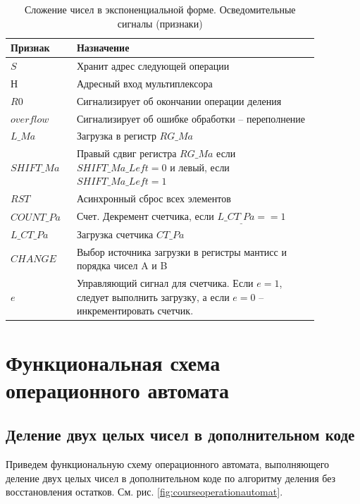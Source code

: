 \documentclass[a4paper,14pt]{extarticle}
\begin{document}
\begin{table}[h!]
	\centering
	\small
	\begin{tabular}{|m{0.17\linewidth}|m{0.7\linewidth}|}
		\hline
		\textbf{Признак} & \textbf{Назначение} \\ \hline
		$S$ & Хранит адрес следующей операции \\ \hline
		$Н$ & Адресный вход мультиплексора \\ \hline
		$R0$ & Сигнализирует об окончании операции деления \\ \hline
		$overflow$ & Сигнализирует об ошибке обработки -- переполнение \\ \hline
		$L\_Ma$ & Загрузка в регистр $RG\_Ma$ \\ \hline
		$SHIFT\_Ma$ & Правый сдвиг регистра $RG\_Ma$ если $SHIFT\_Ma\_Left=0$ и левый, если  $SHIFT\_Ma\_Left=1$ \\ \hline
		$RST$ & Асинхронный сброс всех элементов \\ \hline
		$COUNT\_Pa$ & Счет. Декремент счетчика, если $L\_CT_\_Pa==1$ \\ \hline
		$L\_CT\_Pa$ & Загрузка счетчика $CT\_Pa$ \\ \hline
		$CHANGE$ & Выбор источника загрузки в регистры мантисс и порядка чисел A и B \\ \hline
		$e$ & Управляющий сигнал для счетчика. Если $e=1$, следует выполнить загрузку, а если $e=0$ -- инкрементировать счетчик. \\ \hline
	\end{tabular}
	\caption{Сложение чисел в экспоненциальной форме. Осведомительные сигналы (признаки)}
	\label{tab:signalsop2}
\end{table}




\section{Функциональная схема операционного автомата}
\subsection{Деление двух целых чисел в дополнительном коде}
Приведем функциональную схему операционного автомата, выполняющего деление двух целых чисел в дополнительном коде по алгоритму деления без восстановления остатков. См. рис. \ref{fig:courseoperationautomat}.
\end{document}
